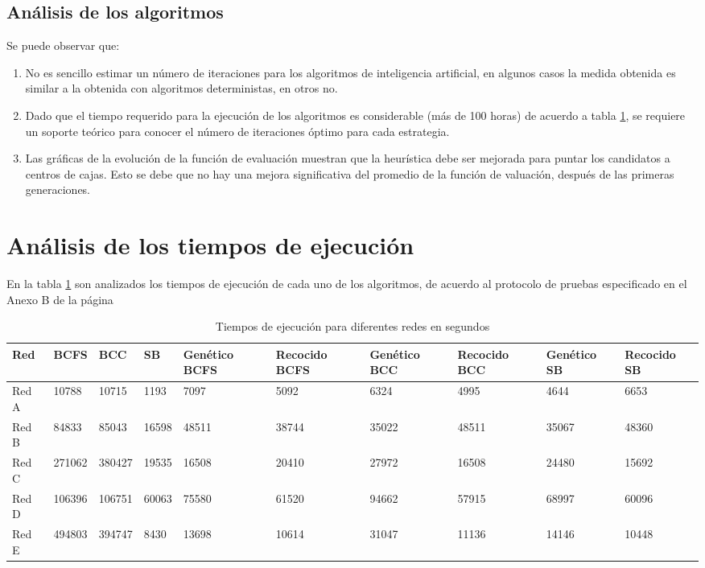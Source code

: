 \subsection{Análisis de los algoritmos}

Se puede observar que:

\begin{enumerate}
    \item No es sencillo estimar un número de iteraciones para los algoritmos de inteligencia artificial, en algunos casos la medida obtenida es similar a la obtenida con algoritmos deterministas, en otros no.
    \item Dado que el tiempo requerido para la ejecución de los algoritmos es considerable (más de 100 horas) de acuerdo a tabla \ref{tab:executionTimes}, se requiere un soporte teórico para conocer el número de iteraciones óptimo para cada estrategia.
    \item Las gráficas de la evolución de la función de evaluación muestran que la heurística debe ser mejorada para puntar los candidatos a centros de cajas. Esto se debe que no hay una mejora significativa del promedio de la función de valuación, después de las primeras generaciones.
\end{enumerate}

\section{Análisis de los tiempos de ejecución}

En la tabla \ref{tab:executionTimes} son analizados los tiempos de ejecución de cada uno de los algoritmos, de acuerdo al protocolo de pruebas especificado en el Anexo B de la página \pageref{AnexoB}

\begin{table}[H]
    \centering
    \begin{tabular}{|p{1cm}|p{1cm}|p{1.1cm}|p{1cm}|p{1.5cm}|p{1.5cm}|p{1.5cm}|p{1.5cm}|p{1.5cm}|p{1.5cm}|}
         \hline
         \textbf{Red} & \textbf{BCFS} & \textbf{BCC} & \textbf{SB} & \textbf{Genético BCFS} & \textbf{Recocido BCFS} &
         \textbf{Genético BCC} & \textbf{Recocido BCC} &
         \textbf{Genético SB} & \textbf{Recocido SB} \\
         \hline
         Red A & 10788 & 10715 & 1193 & 7097 & 5092 & 6324 & 4995 &4644 & 6653 \\
         \hline
         Red B & 84833 & 85043  & 16598  & 48511  & 38744  &  35022 & 48511 & 35067 & 48360  \\
         \hline
         Red C & 271062 & 380427 & 19535  &  16508 & 20410  &  27972 & 16508 & 24480 & 15692  \\
         \hline
         Red D & 106396 & 106751 &  60063 & 75580  & 61520  & 94662  & 57915  & 68997 &  60096 \\
         \hline
         Red E & 494803 & 394747 &  8430 & 13698  & 10614  & 31047  & 11136  & 14146 &  10448 \\
         \hline
    \end{tabular}
    \caption{Tiempos de ejecución para diferentes redes en segundos}
    \label{tab:executionTimes}
\end{table}

